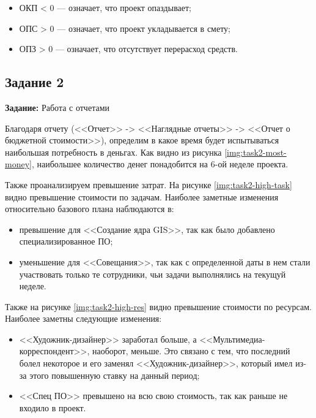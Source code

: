 \begin{itemize}
    \item ОКП < 0 --- означает, что проект опаздывает;
    \item ОПС > 0 --- означает, что проект укладывается в смету;
    \item ОПЗ > 0 --- означает, что отсутствует перерасход средств.
\end{itemize}



\clearpage
\subsection{Задание 2}

\textbf{Задание:} Работа с отчетами

Благодаря отчету (<<Отчет>> -> <<Наглядные отчеты>> -> <<Отчет о бюджетной стоимости>>), определим в какое время будет испытываться наибольшая потребность в деньгах. Как видно из рисунка \ref{img:task2-most-money}, наибольшее количество денег понадобится на 6-ой неделе проекта.


Также проанализируем превышение затрат. На рисунке \ref{img:task2-high-task} видно превышение стоимости по задачам. Наиболее заметные изменения относительно базового плана наблюдаются в:

\begin{itemize}
    \item превышение для <<Создание ядра GIS>>, так как было добавлено специализированное ПО;
    \item уменьшение для <<Совещания>>, так как с определенной даты в нем стали участвовать только те сотрудники, чьи задачи выполнялись на текущуй неделе.
\end{itemize}

Также на рисунке \ref{img:task2-high-res} видно превышение стоимости по ресурсам. Наиболее заметны следующие изменения:

\begin{itemize}
    \item <<Художник-дизайнер>> заработал больше, а <<Мультимедиа-корреспондент>>, наоборот, меньше. Это связано с тем, что последний болел некоторое и его заменял <<Художник-дизайнер>>, который имел из-за этого повышенную ставку на данный период;
    \item <<Спец ПО>> превышено на всю свою стоимость, так как раньше не входило в проект.
\end{itemize}

